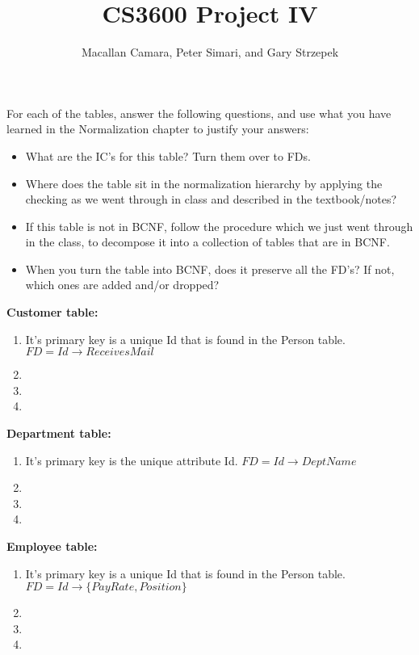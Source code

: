 \documentclass{article}
\title{CS3600 Project IV}
\author{Macallan Camara, Peter Simari, and Gary Strzepek}
\begin{document}
  \maketitle
  \par For each of the tables, answer the following questions, and use what you
  have learned in the Normalization chapter to justify your answers:
  \begin{itemize}
  	\item What are the IC's for this table? Turn them over to FDs.
  	\item Where does the table sit in the normalization hierarchy by applying the
  	checking as we went through in class and described in the textbook/notes?
  	\item If this table is not in BCNF, follow the procedure which we just went
  	through in the class, to decompose it into a collection of tables that are in
  	BCNF.
  	\item When you turn the table into BCNF, does it preserve all the FD's? If
  	not, which ones are added and/or dropped?
  \end{itemize}
  \par\textbf{Customer table:}
  \begin{enumerate}[label=\roman*]
  	\item It's primary key is a unique Id that is found in the Person table. \newline
    $FD = Id \rightarrow ReceivesMail$
  	\item
  	\item
  	\item
  \end{enumerate}
  \par\textbf{Department table:}
  \begin{enumerate}[label=\roman*]
  	\item It's primary key is the unique attribute Id. \newline
    $FD = Id \rightarrow DeptName$
  	\item
  	\item
  	\item
  \end{enumerate}
  \par\textbf{Employee table:}
  \begin{enumerate}[label=\roman*]
  	\item It's primary key is a unique Id that is found in the Person table. \newline
    $FD = Id \rightarrow \{PayRate, Position\}$
  	\item
  	\item
  	\item
  \end{enumerate}
\end{document}
